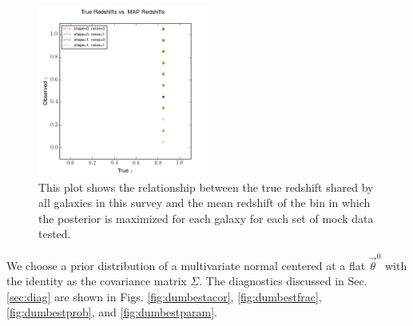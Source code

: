 \documentclass[preprint]{aastex}
\newcommand{\textul}{\underline}
\begin{document}
\begin{figure}
\includegraphics[width=0.5\textwidth]{truevmap-toy.png}
\caption{This plot shows the relationship between the true redshift shared by all galaxies in this survey and the mean redshift of the bin in which the posterior is maximized for each galaxy for each set of mock data tested.}
\label{fig:toycat}
\end{figure}

We choose a prior distribution of a multivariate normal centered at a flat $\vec{\theta}^{0}$ with the identity as the covariance matrix $\textul{\Sigma}$.  The diagnostics discussed in Sec. \ref{sec:diag} are shown in Figs. \ref{fig:dumbestacor}, \ref{fig:dumbestfrac}, \ref{fig:dumbestprob}, and \ref{fig:dumbestparam}.%


\end{document}
